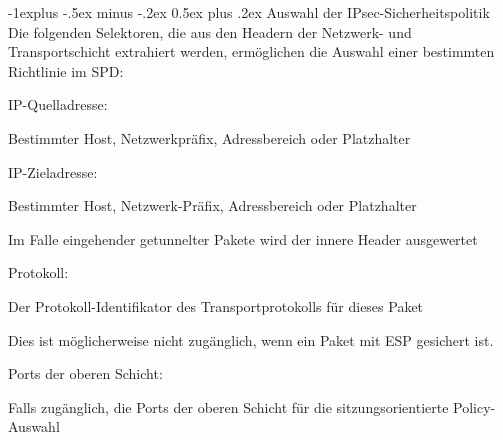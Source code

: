 \documentclass[a4paper]{article}
\makeatletter
\renewcommand{\subsection}{\@startsection{subsection}{2}{0mm}%
 {-1explus -.5ex minus -.2ex}%
 {0.5ex plus .2ex}%
 {\normalfont\normalsize\bfseries}}
\makeatother
\begin{document}
\begin{multicols}{3}
      \subsection{Auswahl der IPsec-Sicherheitspolitik}
      Die folgenden Selektoren, die aus den Headern der Netzwerk- und Transportschicht extrahiert werden, ermöglichen die Auswahl einer bestimmten Richtlinie im SPD:
      \begin{itemize*}
            \item IP-Quelladresse:
            \begin{itemize*}
                  \item Bestimmter Host, Netzwerkpräfix, Adressbereich oder Platzhalter
            \end{itemize*}
            \item IP-Zieladresse:
            \begin{itemize*}
                  \item Bestimmter Host, Netzwerk-Präfix, Adressbereich oder Platzhalter
                  \item Im Falle eingehender getunnelter Pakete wird der innere Header ausgewertet
            \end{itemize*}
            \item Protokoll:
            \begin{itemize*}
                  \item Der Protokoll-Identifikator des Transportprotokolls für dieses Paket
                  \item Dies ist möglicherweise nicht zugänglich, wenn ein Paket mit ESP gesichert ist.
            \end{itemize*}
            \item Ports der oberen Schicht:
            \begin{itemize*}
                  \item Falls zugänglich, die Ports der oberen Schicht für die sitzungsorientierte Policy-Auswahl
            \end{itemize*}
      \end{itemize*}


\end{multicols}
\end{document}
